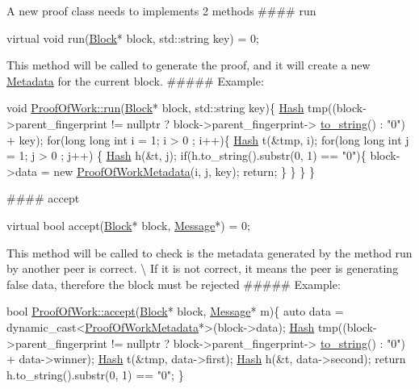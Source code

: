 A new proof class needs to implements 2 methods \#\#\#\# run 
\begin{DoxyCode}
\textcolor{keyword}{virtual} \textcolor{keywordtype}{void} run(\mbox{\hyperlink{classBlock}{Block}}* block, std::string key) = 0;
\end{DoxyCode}
 This method will be called to generate the proof, and it will create a new \mbox{\hyperlink{classMetadata}{Metadata}} for the current block. \#\#\#\#\# Example\+: 
\begin{DoxyCode}
\textcolor{keywordtype}{void} \mbox{\hyperlink{classProofOfWork_a31d9107577bafc58c5ce2374e79f2b3c}{ProofOfWork::run}}(\mbox{\hyperlink{classBlock}{Block}}* block, std::string key)\{
    \mbox{\hyperlink{classHash}{Hash}} tmp((block->parent\_fingerprint != \textcolor{keyword}{nullptr} ? block->parent\_fingerprint->
      \mbox{\hyperlink{classHash_ab1c275871d3d81cd38d58dac5c634042}{to\_string}}() : \textcolor{stringliteral}{"0"}) + key);
    \textcolor{keywordflow}{for}(\textcolor{keywordtype}{long} \textcolor{keywordtype}{long} \textcolor{keywordtype}{int} i = 1; i > 0 ; i++)\{
        \mbox{\hyperlink{classHash}{Hash}} t(\&tmp, i);
        \textcolor{keywordflow}{for}(\textcolor{keywordtype}{long} \textcolor{keywordtype}{long} \textcolor{keywordtype}{int} j = 1; j > 0 ; j++) \{
            \mbox{\hyperlink{classHash}{Hash}} h(\&t, j);
            \textcolor{keywordflow}{if}(h.to\_string().substr(0, 1) == \textcolor{stringliteral}{"0"})\{
                block->data = \textcolor{keyword}{new} \mbox{\hyperlink{classProofOfWorkMetadata}{ProofOfWorkMetadata}}(i, j, key);
                \textcolor{keywordflow}{return};
            \}
        \}
    \}
\}
\end{DoxyCode}
 \#\#\#\# accept 
\begin{DoxyCode}
\textcolor{keyword}{virtual} \textcolor{keywordtype}{bool} accept(\mbox{\hyperlink{classBlock}{Block}}* block, \mbox{\hyperlink{classMessage}{Message}}*) = 0;
\end{DoxyCode}
 This method will be called to check is the metadata generated by the method run by another peer is correct. \textbackslash{} If it is not correct, it means the peer is generating false data, therefore the block must be rejected \#\#\#\#\# Example\+: 
\begin{DoxyCode}
\textcolor{keywordtype}{bool} \mbox{\hyperlink{classProofOfWork_aa414484a6dc03fec583996a591f36856}{ProofOfWork::accept}}(\mbox{\hyperlink{classBlock}{Block}}* block, \mbox{\hyperlink{classMessage}{Message}}* m)\{
    \textcolor{keyword}{auto} data = \textcolor{keyword}{dynamic\_cast<}\mbox{\hyperlink{classProofOfWorkMetadata}{ProofOfWorkMetadata}}*\textcolor{keyword}{>}(block->data);
    \mbox{\hyperlink{classHash}{Hash}} tmp((block->parent\_fingerprint != \textcolor{keyword}{nullptr} ? block->parent\_fingerprint->
      \mbox{\hyperlink{classHash_ab1c275871d3d81cd38d58dac5c634042}{to\_string}}() : \textcolor{stringliteral}{"0"}) + data->winner);
    \mbox{\hyperlink{classHash}{Hash}} t(\&tmp, data->first);
    \mbox{\hyperlink{classHash}{Hash}} h(\&t, data->second);
    \textcolor{keywordflow}{return} h.to\_string().substr(0, 1) == \textcolor{stringliteral}{"0"};
\}
\end{DoxyCode}
